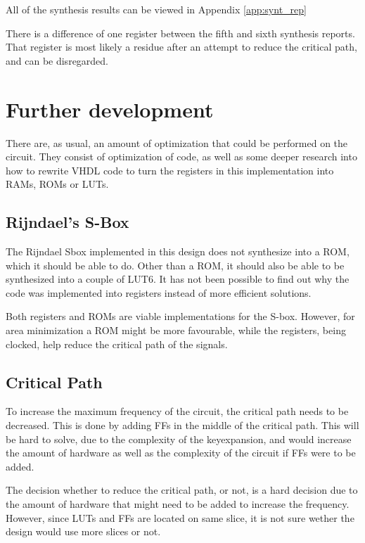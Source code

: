 All of the synthesis results can be viewed in Appendix 
\ref{app:synt_rep}


There is a difference of one register between the fifth and sixth 
synthesis reports. That register is most likely a residue after an 
attempt to reduce the critical path, and can be disregarded.

\section{Further development}
There are, as usual, an amount of optimization that could be performed 
on the circuit. They consist of optimization of code, as well as some 
deeper research into how to rewrite VHDL code to turn the registers in 
this implementation into RAMs, ROMs or LUTs.

\subsection{Rijndael's S-Box}
The Rijndael Sbox implemented in this design does not synthesize into a 
ROM, which it should be able to do. Other than a ROM, it should also be 
able to be synthesized into a couple of LUT6.
It has not been possible to find out why the code was implemented into 
registers instead of more efficient solutions.

Both registers and ROMs are viable implementations for the S-box. 
However, for area minimization a ROM might be more favourable, while 
the registers, being clocked, help reduce the critical path of the 
signals.

\subsection{Critical Path}\label{sec:c_path}
To increase the maximum frequency of the circuit, the critical path 
needs to be decreased. This is done by adding FFs in the middle of the 
critical path. This will be hard to solve, due to the complexity of the 
keyexpansion, and would increase the amount of hardware as well as the 
complexity of the circuit if FFs were to be added.

The decision whether to reduce the critical path, or not, is a hard 
decision due to the amount of hardware that might need to be added to
increase the frequency. However, since LUTs and FFs are located on 
same slice, it is not sure wether the design would use more slices or 
not.

